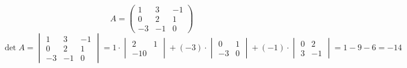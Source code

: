 \documentclass[12pt, a4paper]{article}
\begin{document}
    \begin{exmp}
        \[
            A = \begin{pmatrix} 1 & 3 & -1 \\ 0 & 2 & 1 \\ -3 & -1 & 0 \end{pmatrix} 
        \] 
        \[
            \det A = \begin{vmatrix} 1 & 3 & -1 \\ 0 & 2 & 1 \\ -3 & -1 & 0\end{vmatrix} = 1 \cdot  \begin{vmatrix} 2 & 1 \\ -1 0\end{vmatrix} + (-3) \cdot \begin{vmatrix} 0 & 1 \\ -3 & 0\end{vmatrix} + (-1) \cdot \begin{vmatrix} 0 & 2 \\ 3 & -1\end{vmatrix} = 1 - 9 - 6 = -14
        \] 
        
    \end{exmp}
\end{document}
